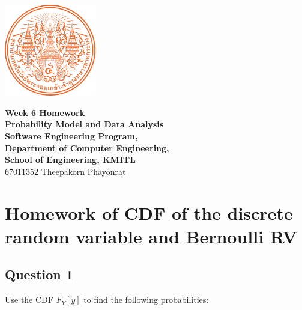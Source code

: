\documentclass[12pt]{report} %
\begin{document}
\begin{titlepage}
	\centering
	\vspace*{1cm} %
	\includegraphics[width=0.3\textwidth]{../images/KMITL Logo.png} %

	\vspace{1cm} %
	{\LARGE \textbf{Week 6 Homework}} \\[0.5cm] %
	\vspace{0.5cm}
	{\large \textbf{Probability Model and Data Analysis}} \\[0.5cm]
    {\large \textbf{Software Engineering Program,}} \\[0.5cm]
	{\large \textbf{Department of Computer Engineering,}} \\[0.5cm]
	{\large \textbf{School of Engineering, KMITL}} \\[1cm]
    {\Large 67011352 Theepakorn Phayonrat} \\[0.5cm] %
\end{titlepage}

\section*{Homework of CDF of the discrete random variable and Bernoulli RV}

\subsection*{Question 1}

\noindent Use the CDF $F_Y[y]$ to find the following probabilities: \\
\end{document}
